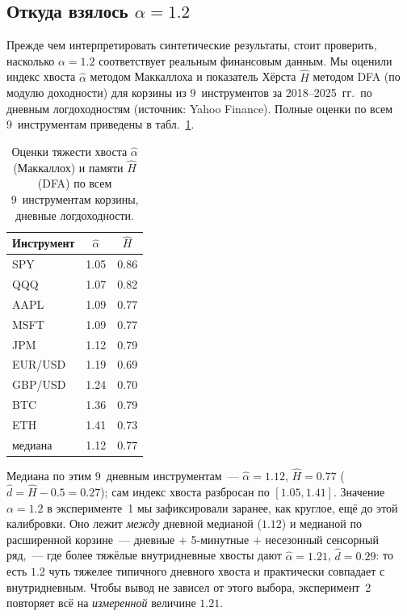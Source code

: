 \documentclass[conference]{IEEEtran}
\begin{document}
\subsection{Откуда взялось $\alpha=1.2$}

Прежде чем интерпретировать синтетические результаты, стоит проверить,
насколько $\alpha=1.2$ соответствует реальным финансовым данным. Мы
оценили индекс хвоста $\hat{\alpha}$ методом Маккаллоха и показатель
Хёрста $\hat{H}$ методом DFA (по модулю доходности) для корзины из
9~инструментов за 2018--2025~гг.\ по дневным логдоходностям (источник:
Yahoo Finance). Полные оценки по всем 9~инструментам приведены в
табл.~\ref{tab:realdiag}.

\begin{table}[H]
\centering\footnotesize
\setlength{\tabcolsep}{4pt}
\caption{Оценки тяжести хвоста $\hat{\alpha}$ (Маккаллох) и памяти
$\hat{H}$ (DFA) по всем 9~инструментам корзины, дневные логдоходности.}
\label{tab:realdiag}
\begin{tabular}{lcc}
\toprule
Инструмент & $\hat{\alpha}$ & $\hat{H}$ \\
\midrule
SPY         & 1.05 & 0.86 \\
QQQ         & 1.07 & 0.82 \\
AAPL        & 1.09 & 0.77 \\
MSFT        & 1.09 & 0.77 \\
JPM         & 1.12 & 0.79 \\
EUR/USD     & 1.19 & 0.69 \\
GBP/USD     & 1.24 & 0.70 \\
BTC         & 1.36 & 0.79 \\
ETH         & 1.41 & 0.73 \\
\midrule
медиана     & 1.12 & 0.77 \\
\bottomrule
\end{tabular}
\end{table}

Медиана по этим 9~дневным инструментам~--- $\hat{\alpha}=1.12$,
$\hat{H}=0.77$ ($\hat{d}=\hat{H}-0.5=0.27$); сам индекс хвоста разбросан
по $[1.05,1.41]$. Значение $\alpha=1.2$ в эксперименте~1 мы зафиксировали
заранее, как круглое, ещё до этой калибровки. Оно лежит \emph{между}
дневной медианой ($1.12$) и медианой по расширенной корзине~--- дневные
$+$ 5-минутные $+$ несезонный сенсорный ряд,~--- где более тяжёлые
внутридневные хвосты дают $\hat{\alpha}=1.21$, $\hat{d}=0.29$: то есть
$1.2$ чуть тяжелее типичного дневного хвоста и практически совпадает с
внутридневным. Чтобы вывод не зависел от этого выбора, эксперимент~2
повторяет всё на \emph{измеренной} величине $1.21$.
\end{document}
